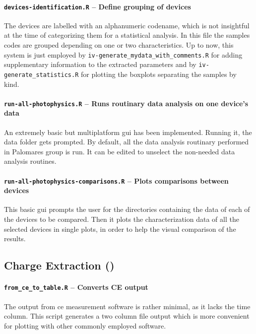 		\paragraph{\texttt{devices-identification.R} -- Define grouping of devices}
		The devices are labelled with an alphanumeric codename, which is not insightful at the time of categorizing them for a statistical analysis.
		In this file the samples codes are grouped depending on one or two characteristics.
		Up to now, this system is just employed by \texttt{iv-generate_mydata_with_comments.R} for adding supplementary information to the extracted parameters and by \texttt{iv-generate_statistics.R} for plotting the boxplots separating the samples by kind.

		\paragraph{\texttt{run-all-photophysics.R} -- Runs routinary data analysis on one device's data}
		An extremely basic but multiplatform \gls{gui} has been implemented.
		Running it, the data folder gets prompted.
		By default, all the data analysis routinary performed in Palomares group is run.
		It can be edited to unselect the non-needed data analysis routines.
		
		\paragraph{\texttt{run-all-photophysics-comparisons.R} -- Plots comparisons between devices}
		This basic \gls{gui} prompts the user for the directories containing the data of each of the devices to be compared.
		Then it plots the characterization data of all the selected devices in single plots, in order to help the visual comparison of the results.
		


	\subsection{Charge Extraction ()}\label{r_ce}

		\paragraph{\texttt{from_ce_to_table.R} -- Converts CE output}
		The output from \gls{ce} measurement software is rather minimal, as it lacks the time column.
		This script generates a two column file output which is more convenient for plotting with other commonly employed software.
